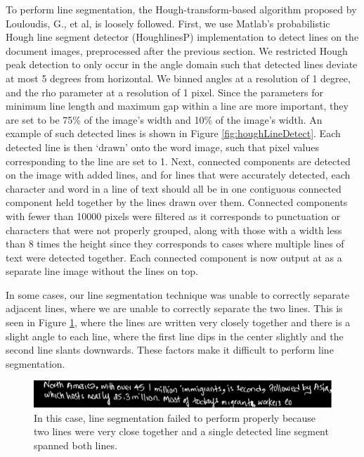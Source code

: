 \documentclass[paper=a4, fontsize=11pt]{scrartcl} %
\numberwithin{equation}{section} %
\numberwithin{figure}{section} %
\numberwithin{table}{section} %
\begin{document}
To perform line segmentation, the Hough-transform-based algorithm
proposed by Louloudis, G., et al, \cite{BlockBased} is loosely
followed. First, we use Matlab's probabilistic Hough line segment
detector (HoughlinesP) implementation to detect lines on the document
images, preprocessed after the previous section. We restricted Hough
peak detection to only occur in the angle domain such that detected
lines deviate at most 5 degrees from horizontal. We binned angles at a
resolution of 1 degree, and the rho parameter at a resolution of 1
pixel. Since the parameters for minimum line length and maximum gap within a line are more important, they are set to be 75\% of the image's width
and 10\% of the image's width. An example of such detected lines is
shown in Figure \ref{fig:houghLineDetect}. Each detected line is then ‘drawn’ onto the word image, such that pixel values corresponding to the line are set to 1. Next, connected components are detected on the image with added lines, and for lines that were accurately detected, each character and word in a line of text should all be in one contiguous connected component held together by the lines drawn over them. Connected components with fewer than 10000 pixels were filtered as it corresponds to punctuation or characters that were not properly grouped, along with  those with a width less than 8 times the height since they corresponds to cases where multiple lines of text were detected together. Each connected component is now output at as a separate line image without the lines on top.

In some cases, our line segmentation technique was unable to correctly separate adjacent lines, where we are unable to correctly separate the two lines. This is seen in Figure \ref{fig:linefail}, where the lines are written very closely together and there is a slight angle to each line, where the first line dips in the center slightly and the second line slants downwards. These factors make it difficult to perform line segmentation.

\begin{figure}
\centering \includegraphics{linefail.png}
\caption{In this case, line segmentation failed to perform properly because two lines were very close together and a single detected line segment spanned both lines.}
\label{fig:linefail}
\end{figure}
\end{document}

